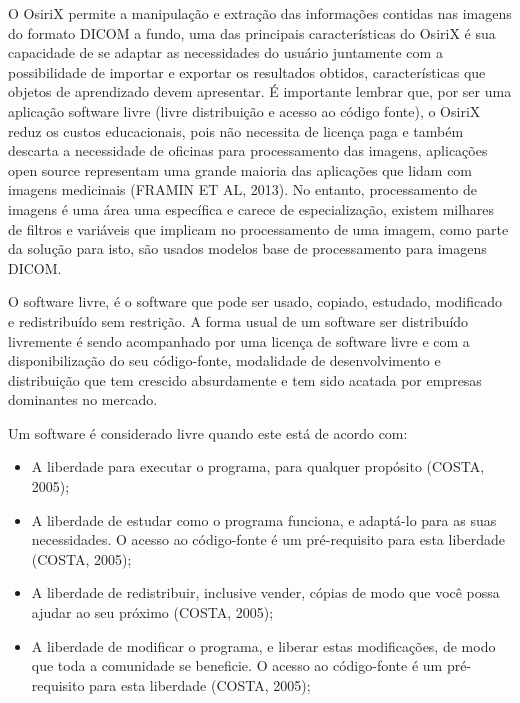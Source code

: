 \documentclass[12pt,openright,oneside,a4paper,english,french,spanish,brazil]{unifil}
\begin{document}
O OsiriX permite a manipulação e extração das informações contidas nas imagens do formato DICOM a fundo, uma das principais características do OsiriX é sua capacidade de se adaptar as necessidades do usuário juntamente com a possibilidade de importar e exportar os resultados obtidos, características que objetos de aprendizado devem apresentar. É importante lembrar que, por ser uma aplicação software livre (livre distribuição e acesso ao código fonte), o OsiriX reduz os custos educacionais, pois não necessita de licença paga e também descarta a necessidade de oficinas para processamento das imagens, aplicações open source representam uma grande maioria das aplicações que lidam com imagens medicinais (\uppercase{Framin et al}, 2013). No entanto, processamento de imagens é uma área uma específica e carece de especialização, existem milhares de filtros e variáveis que implicam no processamento de uma imagem, como parte da solução para isto, são usados modelos base de processamento para imagens DICOM.

O software livre, é o software que pode ser usado, copiado, estudado, modificado e redistribuído sem restrição. A forma usual de um software ser distribuído livremente é sendo acompanhado por uma licença de software livre e com a disponibilização do seu código-fonte, modalidade de desenvolvimento e distribuição que tem crescido absurdamente e tem sido acatada por empresas dominantes no mercado.

Um software é considerado livre quando este está de acordo com:
\begin{itemize}
\item A liberdade para executar o programa, para qualquer propósito (COSTA, 2005);
\item A liberdade de estudar como o programa funciona, e adaptá-lo para as suas necessidades. O acesso ao código-fonte é um pré-requisito para esta liberdade (COSTA, 2005);
\item A liberdade de redistribuir, inclusive vender, cópias de modo que você possa ajudar ao seu próximo (COSTA, 2005);
\item A liberdade de modificar o programa, e liberar estas modificações, de modo que toda a comunidade se beneficie. O acesso ao código-fonte é um pré-requisito para esta liberdade (COSTA, 2005); 
\end{itemize}
\end{document}
